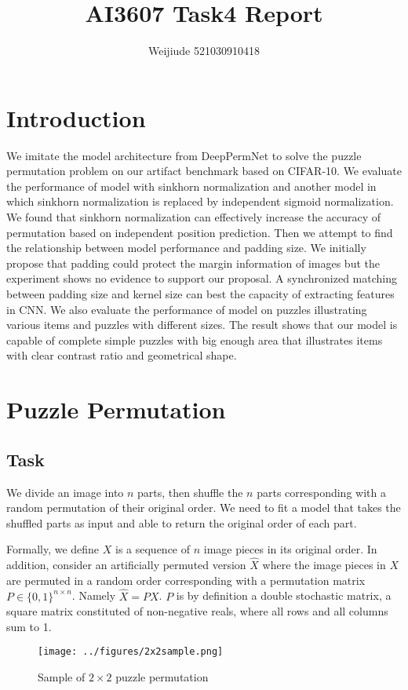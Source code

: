 \documentclass[twocolumn]{article}
\title{AI3607 Task4 Report}
\author{Weijiude 521030910418}
\begin{document}
\maketitle
\section{Introduction}
We imitate the model architecture from DeepPermNet to solve the puzzle permutation problem on our artifact 
benchmark based on CIFAR-10. We evaluate the performance of model with sinkhorn normalization and another 
model in which sinkhorn normalization is replaced by independent sigmoid normalization. We found that 
sinkhorn normalization can effectively increase the accuracy of permutation based on independent position 
prediction. Then we attempt to find the relationship between model performance and padding size. We initially 
propose that padding could protect the margin information of images but the experiment shows no evidence to 
support our proposal. A synchronized matching between padding size and kernel size can best the capacity of 
extracting features in CNN. We also evaluate the performance of model on puzzles illustrating various items 
and puzzles with different sizes. The result shows that our model is capable of complete simple puzzles with 
big enough area that illustrates items with clear contrast ratio and geometrical shape. 
\section{Puzzle Permutation}
\subsection{Task}
We divide an image into $n$ parts, then shuffle the $n$ parts 
corresponding with a random permutation of their original order. We need to fit a model that takes 
the shuffled parts as input and able to return the original order of each part. 

Formally, we define $X$ is a sequence of $n$ image pieces in its original order. In addition, consider 
an artificially permuted version $\hat{X}$ where the image pieces in $X$ are permuted in a random order 
corresponding with a permutation matrix $P\in\{0, 1\}^{n\times n}$. Namely $\hat{X}=PX$. $P$ is by 
definition a double stochastic matrix, a square matrix constituted of non-negative reals, where all rows 
and all columns sum to 1. 
\begin{figure}[h]
    \centering
    \texttt{[image: ../figures/2x2sample.png]}
    \caption{Sample of $2\times 2$ puzzle permutation}
\end{figure}
\end{document}
